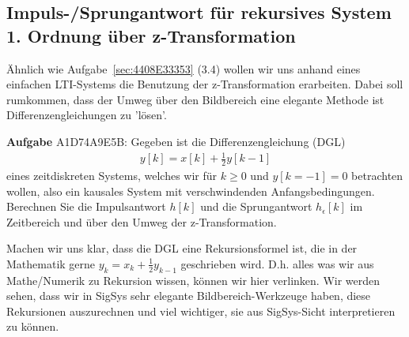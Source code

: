 \subsection{Impuls-/Sprungantwort für rekursives System 1. Ordnung über z-Transformation}
\label{sec:A1D74A9E5B}
\begin{Ziel}
Ähnlich wie Aufgabe~\ref{sec:4408E33353} (3.4) wollen wir uns anhand eines einfachen LTI-Systems
die Benutzung der z-Transformation erarbeiten. Dabei soll rumkommen, dass
der Umweg über den Bildbereich eine elegante Methode ist Differenzengleichungen
zu 'lösen'.
\end{Ziel}
\textbf{Aufgabe} {\tiny A1D74A9E5B}: Gegeben ist die Differenzengleichung (DGL)
\begin{align}
y[k] = x[k] + \frac{1}{2} y[k-1]
\end{align}
eines zeitdiskreten Systems, welches wir für $k \geq 0$ und $y[k=-1]=0$ betrachten
wollen, also ein kausales System mit verschwindenden Anfangsbedingungen.
Berechnen Sie die Impulsantwort $h[k]$ und die Sprungantwort $h_\epsilon[k]$
im Zeitbereich und über den Umweg der z-Transformation.
\begin{Werkzeug}
Machen wir uns klar, dass die DGL eine Rekursionsformel ist, die
in der Mathematik gerne $y_k = x_k + \frac{1}{2} y_{k-1}$ geschrieben wird. D.h. alles
was wir aus Mathe/Numerik zu Rekursion wissen, können wir hier verlinken.
Wir werden sehen, dass wir in SigSys sehr elegante Bildbereich-Werkzeuge haben,
diese Rekursionen auszurechnen und viel wichtiger, sie aus SigSys-Sicht
interpretieren zu können.
\end{Werkzeug}
